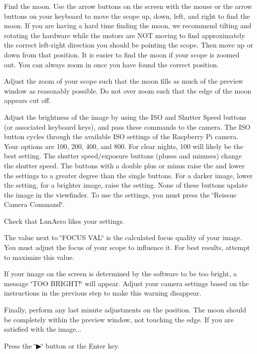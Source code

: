 \begin{DoxyItemize}
\item Find the moon. Use the arrow buttons on the screen with the mouse or the arrow buttons on your keyboard to move the scope up, down, left, and right to find the moon. If you are having a hard time finding the moon, we recommend tilting and rotating the hardware while the motors are N\+OT moving to find approximately the correct left-\/right direction you should be pointing the scope. Then move up or down from that position. It is easier to find the moon if your scope is zoomed out. You can always zoom in once you have found the correct position.
\item Adjust the zoom of your scope such that the moon fills as much of the preview window as reasonably possible. Do not over zoom such that the edge of the moon appears cut off.
\item Adjust the brightness of the image by using the I\+SO and Shutter Speed buttons (or associated keyboard keys), and pass these commands to the camera. The I\+SO button cycles through the available I\+SO settings of the Raspberry Pi camera. Your options are 100, 200, 400, and 800. For clear nights, 100 will likely be the best setting. The shutter speed/exposure buttons (pluses and minuses) change the shutter speed. The buttons with a double plus or minus raise the and lower the settings to a greater degree than the single buttons. For a darker image, lower the setting, for a brighter image, raise the setting. None of these buttons update the image in the viewfinder. To use the settings, you must press the \char`\"{}\+Reissue Camera Command\char`\"{}.
\item Check that Lun\+Aero likes your settings.
\begin{DoxyItemize}
\item The value next to \char`\"{}\+F\+O\+C\+U\+S V\+A\+L\char`\"{} is the calculated focus quality of your image. You must adjust the focus of your scope to influence it. For best results, attempt to maximize this value.
\item If your image on the screen is determined by the software to be too bright, a message \char`\"{}\+T\+O\+O B\+R\+I\+G\+H\+T!\char`\"{} will appear. Adjust your camera settings based on the instructions in the previous step to make this warning disappear.
\end{DoxyItemize}
\item Finally, perform any last minute adjustments on the position. The moon should be completely within the preview window, not touching the edge. If you are satisfied with the image...
\item Press the \char`\"{}▶\char`\"{} button or the {\ttfamily Enter} key.
\end{DoxyItemize}

